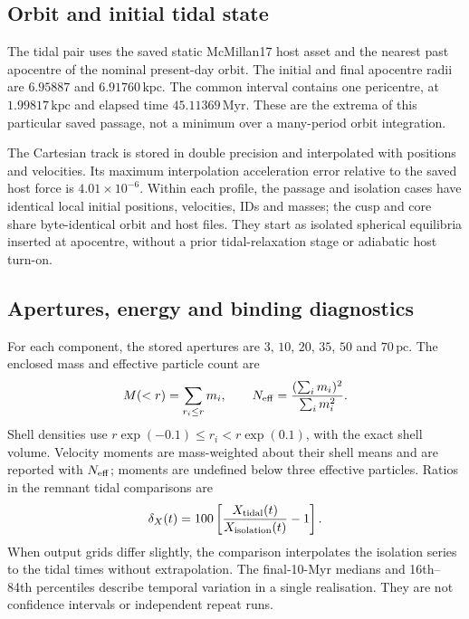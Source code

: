\documentclass[11pt,a4paper]{article}
\newcommand{\pc}{\,\mathrm{pc}}
\newcommand{\kpc}{\,\mathrm{kpc}}
\newcommand{\Myr}{\,\mathrm{Myr}}
\begin{document}
\subsection{Orbit and initial tidal state}

The tidal pair uses the saved static McMillan17 host asset and the nearest
past apocentre of the nominal present-day orbit. The initial and final
apocentre radii are $6.95887$ and $6.91760\kpc$. The common interval contains
one pericentre, at $1.99817\kpc$ and elapsed time $45.11369\Myr$.
These are the extrema of this particular saved passage, not a minimum over
a many-period orbit integration.

The Cartesian track is stored in double precision and interpolated with
positions and velocities. Its maximum interpolation acceleration error
relative to the saved host force is $4.01\times10^{-6}$. Within each profile,
the passage and isolation cases have identical local initial positions,
velocities, IDs and masses; the cusp and core share byte-identical orbit and
host files. They start as isolated spherical equilibria inserted at
apocentre, without a prior tidal-relaxation stage or adiabatic host turn-on.

\subsection{Apertures, energy and binding diagnostics}

For each component, the stored apertures are $3$, $10$, $20$, $35$, $50$ and
$70\pc$. The enclosed mass and effective particle count are
\begin{equation}
 M(<r)=\sum_{r_i\le r}m_i,\qquad
 N_{\rm eff}=\frac{(\sum_i m_i)^2}{\sum_i m_i^2}.
\end{equation}
Shell densities use $r\exp(-0.1)\le r_i<r\exp(0.1)$, with the exact shell
volume. Velocity moments are mass-weighted about their shell means and are
reported with $N_{\rm eff}$; moments are undefined below three effective
particles. Ratios in the remnant tidal comparisons are
\begin{equation}
 \delta_X(t)=100\left[\frac{X_{\rm tidal}(t)}{X_{\rm isolation}(t)}-1\right].
 \label{eq:comparison}
\end{equation}
When output grids differ slightly, the comparison interpolates the isolation
series to the tidal times without extrapolation. The final-10-Myr medians
and 16th--84th percentiles describe temporal variation in a single
realisation. They are not confidence intervals or independent repeat runs.
\end{document}

